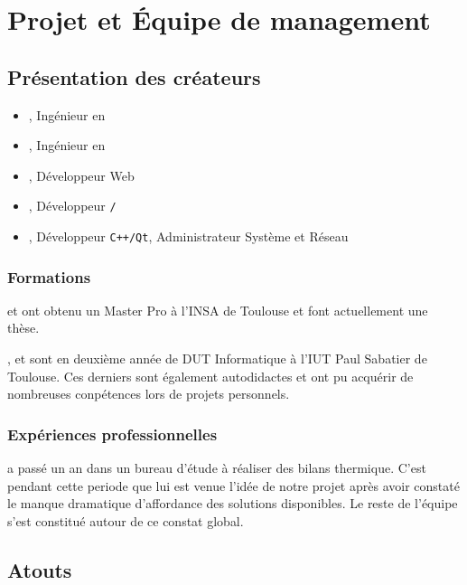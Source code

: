 \chapter{Projet et Équipe de management}
	\section{Présentation des créateurs}
		\begin{itemize}
			\item \Bonte{}, Ingénieur en \gHabitat{}
			\item \Ben{}, Ingénieur en \gHabitat{}
			\item \Drm{}, Développeur Web
			\item \Soum{}, Développeur \texttt{/}
			\item \Clem{}, Développeur \texttt{C++/Qt}, Administrateur Système et Réseau
		\end{itemize}
		
		\subsection{Formations}
			\Bonte{} et \Ben{} ont obtenu un Master Pro \gHabitat{} à l'INSA de Toulouse et
			font actuellement une thèse.

			\Drm{}, \Soum{} et \Clem{} sont en deuxième année de DUT Informatique 
			à l'IUT Paul Sabatier de Toulouse. Ces derniers sont
			également autodidactes et ont pu acquérir de nombreuses conpétences lors de projets personnels.
	
		\subsection{Expériences professionnelles}
			\Bonte{} a passé un an dans un bureau d'étude à réaliser des bilans thermique. C'est pendant cette periode 
			que lui est venue l'idée de notre projet après avoir constaté le manque dramatique d'affordance des solutions disponibles.
			Le reste de l'équipe s'est constitué autour de ce constat global.
	
	\section{Atouts}

